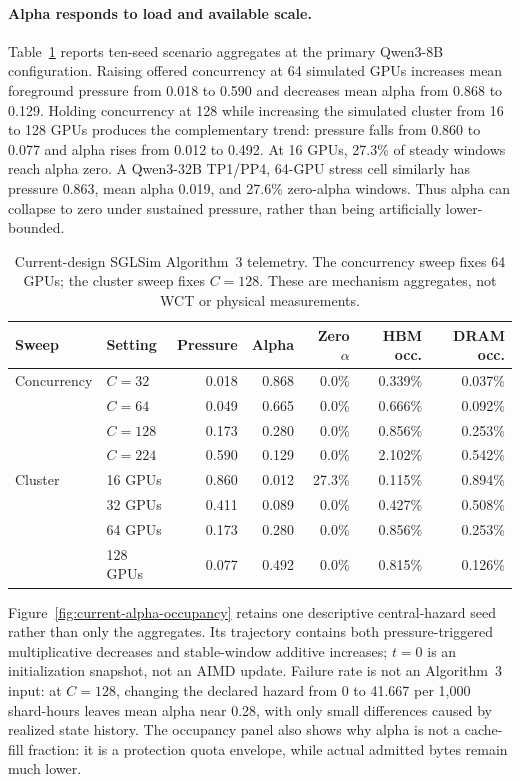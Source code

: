 \paragraph{Alpha responds to load and available scale.}
Table~\ref{tab:alpha-pressure} reports ten-seed scenario aggregates at the
primary Qwen3-8B configuration.  Raising offered concurrency at 64 simulated
GPUs increases mean foreground pressure from 0.018 to 0.590 and decreases
mean alpha from 0.868 to 0.129.  Holding concurrency at 128 while increasing
the simulated cluster from 16 to 128 GPUs produces the complementary trend:
pressure falls from 0.860 to 0.077 and alpha rises from 0.012 to 0.492.  At
16 GPUs, 27.3\% of steady windows reach alpha zero.  A Qwen3-32B TP1/PP4,
64-GPU stress cell similarly has pressure 0.863, mean alpha 0.019, and 27.6\%
zero-alpha windows.  Thus alpha can collapse to zero under sustained
pressure, rather than being artificially lower-bounded.

\begin{table}[t]
  \centering
  \caption{Current-design SGLSim Algorithm~3 telemetry.  The concurrency
  sweep fixes 64 GPUs; the cluster sweep fixes $C=128$.  These are mechanism
  aggregates, not WCT or physical measurements.}
  \label{tab:alpha-pressure}
  \begin{tabular}{@{}llrrrrr@{}}
    \toprule
    Sweep & Setting & Pressure & Alpha & Zero $\alpha$ & HBM occ. & DRAM occ. \\
    \midrule
    Concurrency & $C=32$  & 0.018 & 0.868 & 0.0\% & 0.339\% & 0.037\% \\
                & $C=64$  & 0.049 & 0.665 & 0.0\% & 0.666\% & 0.092\% \\
                & $C=128$ & 0.173 & 0.280 & 0.0\% & 0.856\% & 0.253\% \\
                & $C=224$ & 0.590 & 0.129 & 0.0\% & 2.102\% & 0.542\% \\
    \midrule
    Cluster & 16 GPUs  & 0.860 & 0.012 & 27.3\% & 0.115\% & 0.894\% \\
            & 32 GPUs  & 0.411 & 0.089 & 0.0\% & 0.427\% & 0.508\% \\
            & 64 GPUs  & 0.173 & 0.280 & 0.0\% & 0.856\% & 0.253\% \\
            & 128 GPUs & 0.077 & 0.492 & 0.0\% & 0.815\% & 0.126\% \\
    \bottomrule
  \end{tabular}
\end{table}

Figure~\ref{fig:current-alpha-occupancy} retains one descriptive central-hazard
seed rather than only the aggregates.  Its trajectory contains both
pressure-triggered multiplicative decreases and stable-window additive
increases; $t=0$ is an initialization snapshot, not an AIMD update.  Failure
rate is not an Algorithm~3 input: at $C=128$, changing the declared hazard
from 0 to 41.667 per 1,000 shard-hours leaves mean alpha near 0.28, with only
small differences caused by realized state history.  The occupancy panel also
shows why alpha is not a cache-fill fraction: it is a protection quota
envelope, while actual admitted bytes remain much lower.

